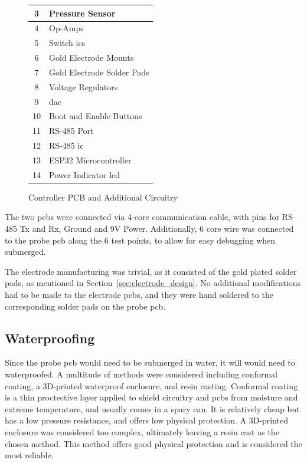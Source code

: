 \begin{figure}[ht]
\begin{minipage}{0.5\textwidth}
\begin{tabular}{cl}
            3 & Pressure Sensor \\ \hline
            4 & Op-Amps \\ \hline
            5 & Switch \gls{ic}s \\ \hline
            6 & Gold Electrode Mounts \\ \hline
            7 & Gold Electrode Solder Pads \\ \hline
            8 & Voltage Regulators \\ \hline
            9 & \gls{dac} \\ \hline
            10 & Boot and Enable Buttons\\ \hline
            11 & RS-485 Port \\ \hline
            12 & RS-485 \gls{ic} \\ \hline
            13 & ESP32 Microcontroller \\ \hline
            14 & Power Indicator \gls{led} \\ \hline
        \end{tabular}
    \end{minipage}
    \caption{Controller PCB and Additional Circuitry}
    \label{fig:controller_pcb} %
\end{figure}

The two \gls{pcb}s were connected via 4-core communication cable, with pins for RS-485 Tx and Rx, Ground and 9V Power.
Additionally, 6 core wire was connected to the probe \gls{pcb} along the 6 test points, to allow for easy debugging when submerged.

The electrode manufacturing was trivial, as it consisted of the gold plated solder pads, as mentioned in Section~\ref{sec:electrode_design}.
No additional modifications had to be made to the electrode \gls{pcb}s, and they were hand soldered to the corresponding solder pads on the probe \gls{pcb}.

\subsection{Waterproofing}
Since the probe \gls{pcb} would need to be submerged in water, it will would need to waterproofed.
A multitude of methods were considered including conformal coating, a 3D-printed waterproof enclosure, and resin casting.
Conformal coating is a thin proctective layer applied to shield circuitry and \gls{pcb}s from moisture and extreme temperature, and usually comes in a spary can.
It is relatively cheap but has a low pressure resistance, and offers low physical protection.
A 3D-printed enclosure was considered too complex, ultimately leaving a resin cast as the chosen method.
This method offers good physical protection and is considered the most reliable.

